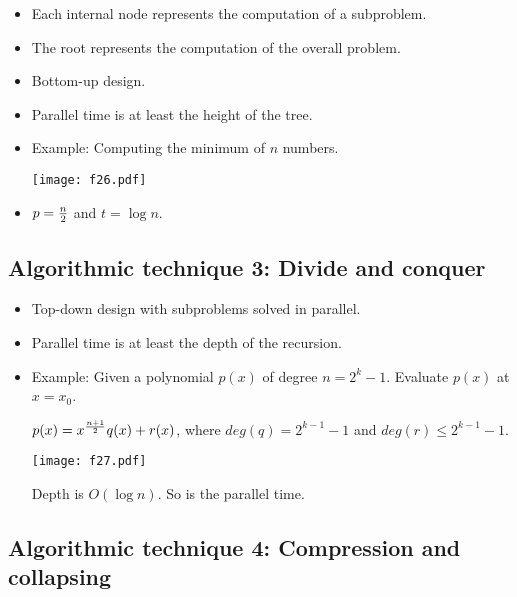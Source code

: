 \documentclass{article}
\begin{document}
\begin{itemize}

\item Each internal node represents the computation of a subproblem.

\item The root represents the computation of the overall problem.

\item Bottom-up design.

\item Parallel time is at least the height of the tree.

\item Example: Computing the minimum of $n$ numbers.

\vskip 0.25cm
\begin{center}
\texttt{[image: f26.pdf]}
\end{center}

\item $p={n\over2}$ and $t=\log n$.

\end{itemize}

\subsection{Algorithmic technique 3: Divide and conquer}

\begin{itemize}

\item Top-down design with subproblems solved in parallel.

\item Parallel time is at least the depth of the recursion.

\item Example: Given a polynomial $p(x)$ of degree $n=2^k-1$.
Evaluate $p(x)$ at $x=x_0$. 

$p(x)=x^{n+1\over2}q(x)+r(x)$, where $deg(q)=2^{k-1}-1$
and $deg(r)\le 2^{k-1}-1$. 

\vskip 0.25cm
\begin{center}
\texttt{[image: f27.pdf]}
\end{center}

Depth is $O(\log n)$. So is the parallel time.

\end{itemize}

\subsection{Algorithmic technique 4: Compression and collapsing}
\end{document}
